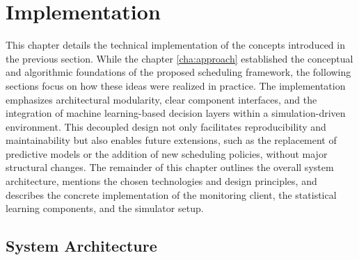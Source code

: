 \section{Implementation}
\label{cha:implementation}
This chapter details the technical implementation of the concepts introduced in the previous section. While the chapter \ref{cha:approach} established the conceptual and algorithmic foundations of the proposed scheduling framework, the following sections focus on how these ideas were realized in practice. The implementation emphasizes architectural modularity, clear component interfaces, and the integration of machine learning-based decision layers within a simulation-driven environment. This decoupled design not only facilitates reproducibility and maintainability but also enables future extensions, such as the replacement of predictive models or the addition of new scheduling policies, without major structural changes. The remainder of this chapter outlines the overall system architecture, mentions the chosen technologies and design principles, and describes the concrete implementation of the monitoring client, the statistical learning components, and the simulator setup.

\subsection{System Architecture}
\label{sec:system_architecture}

